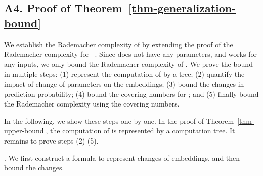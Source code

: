 
\subsection*{A4. Proof of Theorem~\ref{thm-generalization-bound}}
We establish the Rademacher complexity  of \HFrame
by extending the proof of 
the Rademacher complexity for \GNNs~\cite{Gen-bound}.
Since \dual does not have any parameters, 
and works for any inputs, we only 
bound the Rademacher complexity of \HGIN.
We prove the bound in multiple steps:
(1) represent the computation of \HGIN
by a tree;
(2) quantify the impact of change 
of parameters on the embeddings;
(3) bound the changes in prediction probability;
(4) bound the covering numbers for \HGIN;
and (5) finally bound the Rademacher complexity
using the covering numbers.

In the following, we
show these steps one by one. 
In the proof of Theorem~\ref{thm-upper-bound}, 
the computation of \HGIN is represented by a 
computation tree.
It remains to prove steps (2)-(5).	
	
.
We first construct a formula 
to represent changes of embeddings, and then bound the changes.


